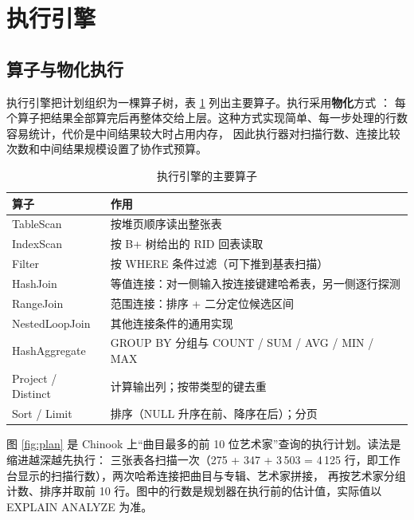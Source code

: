 \documentclass[a4paper,zihao=-4,UTF8,fontset=windows,linespread=1.35]{ctexart}
\begin{document}
\section{执行引擎}\label{sec:executor}

\subsection{算子与物化执行}
执行引擎把计划组织为一棵算子树，表 \ref{tab:ops} 列出主要算子。执行采用\textbf{物化}方式 \cite{graefe1993}：
每个算子把结果全部算完后再整体交给上层。这种方式实现简单、每一步处理的行数容易统计，代价是中间结果较大时占用内存，
因此执行器对扫描行数、连接比较次数和中间结果规模设置了协作式预算。

\begin{table}[!htb]
\centering\small
\caption{执行引擎的主要算子}\label{tab:ops}
\begin{tabularx}{\textwidth}{>{\ttfamily}p{3.3cm}X}
\toprule
\normalfont 算子 & 作用 \\
\midrule
TableScan & 按堆页顺序读出整张表 \\
IndexScan & 按 B+ 树给出的 RID 回表读取 \\
Filter & 按 WHERE 条件过滤（可下推到基表扫描） \\
HashJoin & 等值连接：对一侧输入按连接键建哈希表，另一侧逐行探测 \\
RangeJoin & 范围连接：排序 + 二分定位候选区间 \\
NestedLoopJoin & 其他连接条件的通用实现 \\
HashAggregate & GROUP BY 分组与 COUNT / SUM / AVG / MIN / MAX \\
Project / Distinct & 计算输出列；按带类型的键去重 \\
Sort / Limit & 排序（NULL 升序在前、降序在后）；分页 \\
\bottomrule
\end{tabularx}
\end{table}

图 \ref{fig:plan} 是 Chinook 上“曲目最多的前 10 位艺术家”查询的执行计划。读法是缩进越深越先执行：
三张表各扫描一次（275 + 347 + 3\,503 = 4\,125 行，即工作台显示的扫描行数），两次哈希连接把曲目与专辑、艺术家拼接，
再按艺术家分组计数、排序并取前 10 行。图中的行数是规划器在执行前的估计值，实际值以 EXPLAIN ANALYZE 为准。
\end{document}
